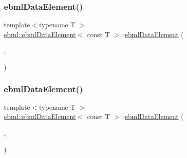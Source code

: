 \subsubsection{\texorpdfstring{ebml\+Data\+Element()}{ebmlDataElement()}\hspace{0.1cm}{\footnotesize\ttfamily [1/2]}}
{\footnotesize\ttfamily template$<$typename T $>$ \\
\mbox{\hyperlink{classebml_1_1ebmlDataElement}{ebml\+::ebml\+Data\+Element}}$<$ const T $>$\+::\mbox{\hyperlink{classebml_1_1ebmlDataElement}{ebml\+Data\+Element}} (\begin{DoxyParamCaption}\item[{const \mbox{\hyperlink{classebml_1_1ebmlDataElementClass}{ebml\+Data\+Element\+Class}}$<$ const T $>$ $\ast$}]{,  }\item[{const T \&}]{ }\end{DoxyParamCaption})\hspace{0.3cm}{\ttfamily [protected]}}

\mbox{\label{classebml_1_1ebmlDataElement_3_01const_01T_01_4_aafdd5fd8f53e58c34891419df8fd196f}} 
\subsubsection{\texorpdfstring{ebml\+Data\+Element()}{ebmlDataElement()}\hspace{0.1cm}{\footnotesize\ttfamily [2/2]}}
{\footnotesize\ttfamily template$<$typename T $>$ \\
\mbox{\hyperlink{classebml_1_1ebmlDataElement}{ebml\+::ebml\+Data\+Element}}$<$ const T $>$\+::\mbox{\hyperlink{classebml_1_1ebmlDataElement}{ebml\+Data\+Element}} (\begin{DoxyParamCaption}\item[{const \mbox{\hyperlink{classebml_1_1ebmlDataElementClass}{ebml\+Data\+Element\+Class}}$<$ const T $>$ $\ast$}]{,  }\item[{T \&\&}]{ }\end{DoxyParamCaption})\hspace{0.3cm}{\ttfamily [protected]}}



